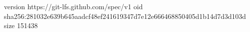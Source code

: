 version https://git-lfs.github.com/spec/v1
oid sha256:281032e639b645aadcf48ef241619347d7e12e666468850405d1b14d7d3d103d
size 151438
